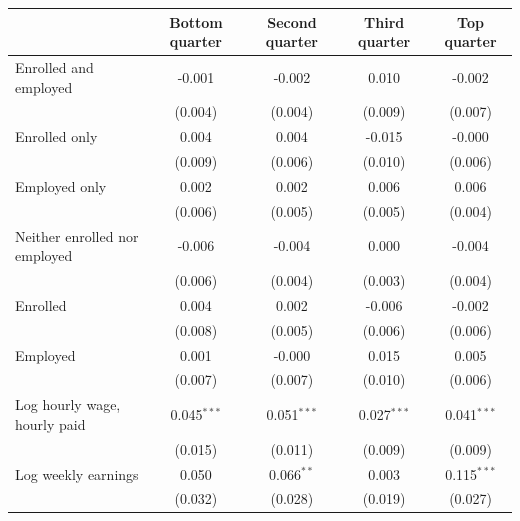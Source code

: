 \begin{tabular}{lcccc}
\toprule
 & Bottom quarter & Second quarter & Third quarter & Top quarter \\
\midrule
Enrolled and employed & -0.001 & -0.002 & 0.010 & -0.002 \\
 & (0.004) & (0.004) & (0.009) & (0.007) \\
Enrolled only & 0.004 & 0.004 & -0.015 & -0.000 \\
 & (0.009) & (0.006) & (0.010) & (0.006) \\
Employed only & 0.002 & 0.002 & 0.006 & 0.006 \\
 & (0.006) & (0.005) & (0.005) & (0.004) \\
Neither enrolled nor employed & -0.006 & -0.004 & 0.000 & -0.004 \\
 & (0.006) & (0.004) & (0.003) & (0.004) \\
Enrolled & 0.004 & 0.002 & -0.006 & -0.002 \\
 & (0.008) & (0.005) & (0.006) & (0.006) \\
Employed & 0.001 & -0.000 & 0.015 & 0.005 \\
 & (0.007) & (0.007) & (0.010) & (0.006) \\
Log hourly wage, hourly paid & 0.045$^{***}$ & 0.051$^{***}$ & 0.027$^{***}$ & 0.041$^{***}$ \\
 & (0.015) & (0.011) & (0.009) & (0.009) \\
Log weekly earnings & 0.050 & 0.066$^{**}$ & 0.003 & 0.115$^{***}$ \\
 & (0.032) & (0.028) & (0.019) & (0.027) \\
\bottomrule
\end{tabular}
